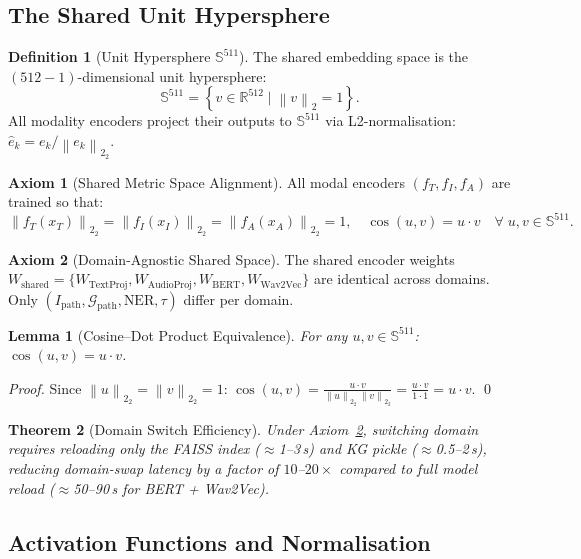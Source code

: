 \documentclass[12pt,a4paper]{article}
\theoremstyle{definition}
\newtheorem{definition}{Definition}[section]
\newtheorem{axiom}{Axiom}[section]
\theoremstyle{plain}
\newtheorem{theorem}{Theorem}[section]
\newtheorem{lemma}[theorem]{Lemma}
\theoremstyle{remark}
\newcommand{\R}{\mathbb{R}}
\newcommand{\Sph}{\mathbb{S}}
\newcommand{\Norm}[1]{\left\|#1\right\|_2}
\newcommand{\KG}{\mathcal{G}}
\begin{document}
\subsection{The Shared Unit Hypersphere}

\begin{definition}[Unit Hypersphere $\Sph^{511}$]
The shared embedding space is the $(512{-}1)$-dimensional unit hypersphere:
\[
  \Sph^{511} = \left\{v \in \R^{512} \;\Big|\; \Norm{v} = 1\right\}.
\]
All modality encoders project their outputs to $\Sph^{511}$ via L2-normalisation: $\hat{e}_k = e_k / \Norm{e_k}_2$.
\end{definition}

\begin{axiom}[Shared Metric Space Alignment]
All modal encoders $(f_T, f_I, f_A)$ are trained so that:
\[
  \Norm{f_T(x_T)}_2 = \Norm{f_I(x_I)}_2 = \Norm{f_A(x_A)}_2 = 1, \quad
  \cos(u,v) = u \cdot v \quad \forall\; u,v \in \Sph^{511}.
\]
\end{axiom}

\begin{axiom}[Domain-Agnostic Shared Space]
\label{ax:shared}
The shared encoder weights
$W_{\text{shared}} = \{W_{\text{TextProj}}, W_{\text{AudioProj}}, W_{\text{BERT}}, W_{\text{Wav2Vec}}\}$
are identical across domains. Only $(I_{\text{path}}, \KG_{\text{path}}, \text{NER}, \tau)$ differ per domain.
\end{axiom}

\begin{lemma}[Cosine--Dot Product Equivalence]
\label{lem:cosdot}
For any $u, v \in \Sph^{511}$: $\cos(u, v) = u \cdot v$.
\end{lemma}
\begin{proof}
Since $\Norm{u}_2 = \Norm{v}_2 = 1$:
$\cos(u,v) = \frac{u \cdot v}{\Norm{u}_2\,\Norm{v}_2} = \frac{u \cdot v}{1 \cdot 1} = u \cdot v.$ \qed
\end{proof}

\begin{theorem}[Domain Switch Efficiency]
\label{thm:switch}
Under Axiom~\ref{ax:shared}, switching domain requires reloading only the FAISS index ($\approx$1--3\,s) and KG pickle ($\approx$0.5--2\,s), reducing domain-swap latency by a factor of $10$--$20\times$ compared to full model reload ($\approx$50--90\,s for BERT + Wav2Vec).
\end{theorem}

\subsection{Activation Functions and Normalisation}
\end{document}
